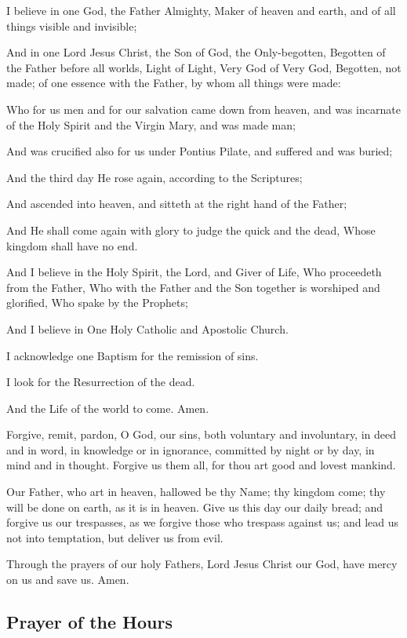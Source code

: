 I believe in one God, the Father Almighty, Maker of heaven and earth, and of all things visible and invisible;

And in one Lord Jesus Christ, the Son of God, the Only-begotten, Begotten of the Father before all worlds, Light of Light, Very God of Very God, Begotten, not made; of one essence with the Father, by whom all things were made:

Who for us men and for our salvation came down from heaven, and was incarnate of the Holy Spirit and the Virgin Mary, and was made man;

And was crucified also for us under Pontius Pilate, and suffered and was buried;

And the third day He rose again, according to the Scriptures;

And ascended into heaven, and sitteth at the right hand of the Father;

And He shall come again with glory to judge the quick and the dead, Whose kingdom shall have no end.

And I believe in the Holy Spirit, the Lord, and Giver of Life, Who proceedeth from the Father, Who with the Father and the Son together is worshiped and glorified, Who spake by the Prophets;

And I believe in One Holy Catholic and Apostolic Church.

I acknowledge one Baptism for the remission of sins.

I look for the Resurrection of the dead.

And the Life of the world to come. Amen.

Forgive, remit, pardon, O God, our sins, both voluntary and involuntary, in deed and in word, in knowledge or in ignorance, committed by night or by day, in mind and in thought. Forgive us them all, for thou art good and lovest mankind.

Our Father, who art in heaven, hallowed be thy Name; thy kingdom come; thy will be done on earth, as it is in heaven. Give us this day our daily bread; and forgive us our trespasses, as we forgive those who trespass against us; and lead us not into temptation, but deliver us from evil.

Through the prayers of our holy Fathers, Lord Jesus Christ our God, have mercy on us and save us. Amen.

\subsection{Prayer of the Hours}


